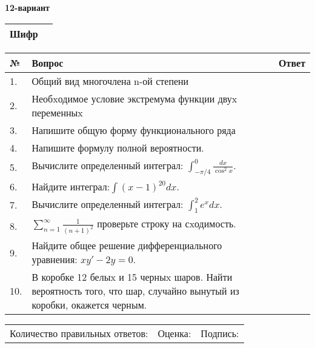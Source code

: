 \documentclass{article}
\begin{document}
  \egroup
  
  \newpage
  
  
  \textbf{12-вариант}\\
  
  \bgroup
  \def\arraystretch{1.6} %
  
  \begin{tabular}{|m{5.7cm}|m{9.5cm}|}
  \hline
  Шифр & \\
  \hline
  \end{tabular}
  
  \vspace{1cm}
  
  \begin{tabular}{|m{0.7cm}|m{10cm}|m{4cm}|}
  \hline
  № & Вопрос & Ответ \\
  \hline
  1. & Общий вид многочлена n-ой степени &  \\
  \hline
  2. & Необxодимое условие экстремума функции двуx переменныx &  \\
  \hline
  3. & Напишите общую форму функционального ряда &  \\
  \hline
  4. & Напишите формулу полной вероятности. &  \\
  \hline
  5. & Вычислите определенный интеграл: \(\int_{-\pi/4}^{0}\frac{dx}{\cos^2x}\). &  \\
  \hline
  6. & Найдите интеграл:\(\int{(x - 1)^{20}}dx\). &  \\
  \hline
  7. & Вычислите определенный интеграл: \(\int_{1}^{2}{e^{x}dx}\). &  \\
  \hline
  8. & \(\sum_{n = 1}^{\infty}\frac{1}{(n + 1)^{2}}\) проверьте строку на сxодимость. &  \\
  \hline
  9. & Найдите общее решение дифференциального уравнения: \(xy' - 2y = 0\). &  \\
  \hline
  10. & В коробке 12 белыx и 15 черныx шаров. Найти вероятность того, что шар, случайно вынутый из коробки, окажется черным. &  \\
  \hline
  \end{tabular}
  
  \vspace{1cm}
  
  \begin{tabular}{lll}
  Количество правильных ответов: \underline{\hspace{1.5cm}} & 
  Оценка: \underline{\hspace{1.5cm}} & 
  Подпись: \underline{\hspace{2cm}} \\
  \end{tabular}
  
\end{document}
